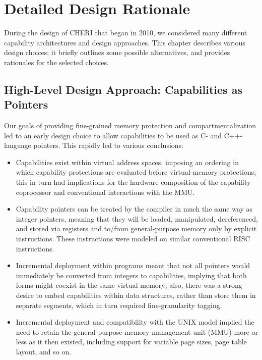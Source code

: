 \chapter{Detailed Design Rationale}
\label{chap:rationale}

During the design of CHERI that began in 2010, we considered many
different capability architectures and design approaches. This chapter
describes various design choices; it briefly outlines some
possible alternatives, and provides rationales for the selected
choices.

\section{High-Level Design Approach: Capabilities as Pointers}

Our goals of providing fine-grained memory protection and compartmentalization
led to an early design choice to allow capabilities to be used as C- and
C++-language pointers.
This rapidly led to various conclusions:

\begin{itemize}
\item Capabilities exist within virtual address spaces, imposing an ordering in
  which capability protections are evaluated before virtual-memory
  protections; this in turn had implications for the hardware composition of
  the capability coprocessor and conventional interactions with the MMU.

\item Capability pointers can be treated by the compiler in much the same way
  as integer pointers, meaning that they will be loaded, manipulated,
  dereferenced, and stored via registers and to/from general-purpose memory
  only by explicit instructions.
  These instructions were modeled on similar conventional RISC instructions.

\item Incremental deployment within programs meant that not all pointers would
  immediately be converted from integers to capabilities, implying that both
  forms might coexist in the same virtual memory;
  also, there was a strong desire to embed capabilities
  within data structures, rather than store them in separate segments,
  which in turn required fine-granularity tagging.

\item Incremental deployment and compatibility with the UNIX model implied
  the need to retain
  the general-purpose memory management unit (MMU) more or less as
  it then existed, including support for variable page sizes, page table layout,
  and so on.
\end{itemize}

